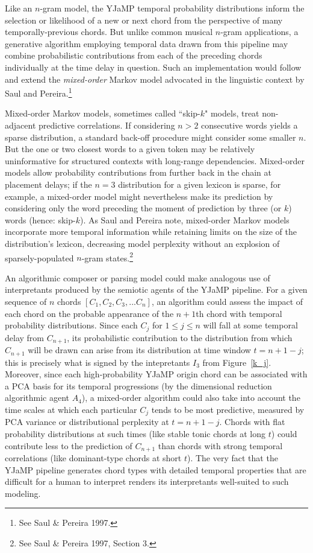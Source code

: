 \begin{enumerate}
Like an $n$-gram model, the YJaMP temporal probability distributions inform the selection or likelihood of a new or next chord from the perspective of many temporally-previous chords.  But unlike common musical $n$-gram applications, a generative algorithm employing temporal data drawn from this pipeline may combine probabilistic contributions from each of the preceding chords individually at the time delay in question. Such an implementation would follow and extend the \emph{mixed-order} Markov model advocated in the linguistic context by Saul and Pereira.\footnote{See Saul 
\& Pereira 1997.}

Mixed-order Markov models, sometimes called ``skip-$k$" models, treat non-adjacent predictive correlations.  If considering $n>2$ consecutive words yields a sparse distribution, a standard back-off procedure might consider some smaller $n$. But the one or two closest words to a given token may be relatively uninformative for structured contexts with long-range dependencies.  Mixed-order models allow probability contributions from further back in the chain at placement delays; if the $n=3$ distribution for a given lexicon is sparse, for example, a mixed-order model might nevertheless make its prediction by considering only the word preceding the moment of prediction by three (or $k$) words (hence: skip-$k$).  As Saul and Pereira note, mixed-order Markov models incorporate more temporal information while retaining limits on the size of the distribution's lexicon, decreasing model perplexity without an explosion of sparsely-populated $n$-gram states.\footnote{See Saul 
\& Pereira 1997, Section 3.}

An algorithmic composer or parsing model could make analogous use of interpretants produced by the semiotic agents of the YJaMP pipeline.  For a given sequence of $n$ chords $[C_1,C_2,C_3,...C_n]$, an algorithm could assess the impact of each chord on the probable appearance of the $n+1$th chord with temporal probability distributions.  Since each $C_j$ for $1\leq j \leq n$ will fall at some temporal delay from $C_{n+1}$, its probabilistic contribution to the distribution from which $C_{n+1}$ will be drawn can arise from its distribution at time window $t= n+1-j$; this is precisely what is signed by the intepretants $I_3$ from Figure~\ref{k_j}.  Moreover, since each high-probability YJaMP origin chord can be associated with a PCA basis for its temporal progressions (by the dimensional reduction algorithmic agent $A_4$), a mixed-order algorithm could also take into account the time scales at which each particular $C_j$ tends to be most predictive, measured by PCA variance or distributional perplexity at $t=n+1-j$.  Chords with flat probability distributions at such times (like stable tonic chords at long $t$) could contribute less to the prediction of $C_{n+1}$ than chords with strong temporal correlations (like dominant-type chords at short $t$).  The very fact that the YJaMP pipeline generates chord types with detailed temporal properties that are difficult for a human to interpret renders its interpretants well-suited to such modeling.
\end{enumerate}


